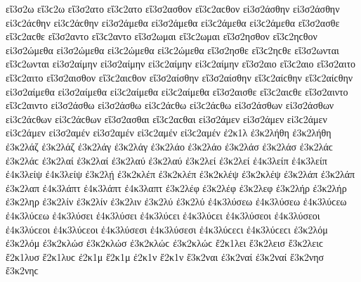 {εἴ3σ2ω εἴ3ϲ2ω 
εἴ3σ2ατο εἴ3ϲ2ατο 
εἴ3σ2ασθον εἴ3ϲ2αϲθον 
εἰ3σ2άσθην εἰ3σ2άσθην εἰ3ϲ2άϲθην εἰ3ϲ2άϲθην 
εἰ3σ2άμεθα εἰ3σ2άμεθα εἰ3ϲ2άμεθα εἰ3ϲ2άμεθα 
εἴ3σ2ασθε εἴ3ϲ2αϲθε 
εἴ3σ2αντο εἴ3ϲ2αντο 
%
εἴ3σ2ωμαι εἴ3ϲ2ωμαι 
εἴ3σ2ησθον εἴ3ϲ2ηϲθον 
εἰ3σ2ώμεθα εἰ3σ2ώμεθα εἰ3ϲ2ώμεθα εἰ3ϲ2ώμεθα 
εἴ3σ2ησθε εἴ3ϲ2ηϲθε 
εἴ3σ2ωνται εἴ3ϲ2ωνται 
%
εἰ3σ2αίμην εἰ3σ2αίμην εἰ3ϲ2αίμην εἰ3ϲ2αίμην 
εἴ3σ2αιο εἴ3ϲ2αιο 
εἴ3σ2αιτο εἴ3ϲ2αιτο 
εἴ3σ2αισθον εἴ3ϲ2αιϲθον 
εἴ3σ2αίσθην εἴ3σ2αίσθην εἴ3ϲ2αίϲθην εἴ3ϲ2αίϲθην 
εἰ3σ2αίμεθα εἰ3σ2αίμεθα εἰ3ϲ2αίμεθα εἰ3ϲ2αίμεθα 
εἴ3σ2αισθε εἴ3ϲ2αιϲθε 
εἴ3σ2αιντο εἴ3ϲ2αιντο 
%
εἰ3σ2άσθω εἰ3σ2άσθω εἰ3ϲ2άϲθω εἰ3ϲ2άϲθω 
εἰ3σ2άσθων εἰ3σ2άσθων εἰ3ϲ2άϲθων εἰ3ϲ2άϲθων 
%
εἴ3σ2ασθαι εἴ3ϲ2αϲθαι 
εἰ3σ2άμεν εἰ3σ2άμεν εἰ3ϲ2άμεν εἰ3ϲ2άμεν   %
εἰ3σ2αμέν εἰ3σ2αμέν εἰ3ϲ2αμέν εἰ3ϲ2αμέν 
%	
ἐ2κ1λ   %
ἐ3κ2λήθη ἐ3κ2λήθη   %
ἐ3κ2λάζ ἐ3κ2λάζ   %
ἐ3κ2λάγ ἐ3κ2λάγ   %
ἐ3κ2λάο ἐ3κ2λάο   %
ἐ3κ2λάσ ἐ3κ2λάσ ἐ3κ2λάϲ ἐ3κ2λάϲ   %
ἐ3κ2λαί ἐ3κ2λαί   %
ἐ3κ2λαύ ἐ3κ2λαύ   %
ἐ3κ2λεί ἐ3κ2λεί   %
ἐ4κ3λείπ ἐ4κ3λείπ   %
ἐ4κ3λείψ ἐ4κ3λείψ   %
ἐ3κ2λῄ   %
ἐ3κ2κλέπ ἐ3κ2κλέπ   %
ἐ3κ2κλέψ ἐ3κ2κλέψ   %
ἐ3κ2λάπ ἐ3κ2λάπ   %
ἐ3κ2λαπ   %
ἐ4κ3λάπτ ἐ4κ3λάπτ   %
ἐ4κ3λαπτ 
ἐ3κ2λέφ ἐ3κ2λέφ   %
ἐ3κ2λεφ   %
ἐ3κ2λήρ ἐ3κ2λήρ   %
ἐ3κ2ληρ   %
ἐ3κ2λίν ἐ3κ2λίν   %
ἐ3κ2λιν   %
ἐ3κ2λύ ἐ3κ2λύ   %
ἐ4κ3λύσεω ἐ4κ3λύσεω ἐ4κ3λύϲεω ἐ4κ3λύϲεω   %
ἐ4κ3λύσει ἐ4κ3λύσει ἐ4κ3λύϲει ἐ4κ3λύϲει 
ἐ4κ3λύσεοι ἐ4κ3λύσεοι ἐ4κ3λύϲεοι ἐ4κ3λύϲεοι 
ἐ4κ3λύσεσι ἐ4κ3λύσεσι ἐ4κ3λύϲεϲι ἐ4κ3λύϲεϲι 
ἐ3κ2λόμ ἐ3κ2λόμ   %
ἐ3κ2κλώσ ἐ3κ2κλώσ ἐ3κ2κλώϲ ἐ3κ2κλώϲ   %
ἔ2κ1λει   %
ἔ3κ2λεισ ἔ3κ2λειϲ   %
ἔ2κ1λυσ ἔ2κ1λυϲ   %
ἐ2κ1μ 
ἔ2κ1μ 
ἐ2κ1ν 
ἔ2κ1ν 
ἔ3κ2ναι   %
ἐ3κ2ναί ἐ3κ2ναί   %
ἔ3κ2νησ ἔ3κ2νηϲ   %
}
